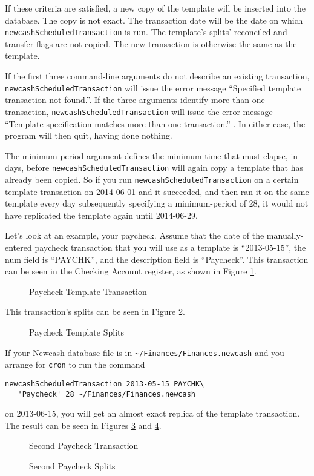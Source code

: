 \documentclass{report}
\newcommand{\graphicsfig}[5]{
\begin{figure}[#5]
\begin{center}
\resizebox{#1}{!}{\texttt{[image: \#2]}}
\end{center}
\caption{#3}
\label{#4}
\end{figure}
}
\begin{document}
If these criteria are satisfied, a new copy of the template will be inserted into the database. The copy is not exact. The transaction date will be the date on which \verb|newcashScheduledTransaction| is run. The template's splits' reconciled and transfer flags are not copied. The new transaction is otherwise the same as the template.

If the first three command-line arguments do not describe an existing transaction, \verb|newcashScheduledTransaction| will issue the error message ``Specified template transaction not found.''. If the three arguments identify more than one transaction, \verb|newcashScheduledTransaction| will issue the error message ``Template specification matches more than one transaction.'' . In either case, the program will then quit, having done nothing.

The minimum-period argument defines the minimum time that must elapse, in days, before \verb|newcashScheduledTransaction| will again copy a template that has already been copied. So if you run \verb|newcashScheduledTransaction| on a certain template transaction on 2014-06-01 and it succeeded, and then ran it on the same template every day subsequently specifying a minimum-period of 28, it would not have replicated the template again until 2014-06-29.

Let's look at an example, your paycheck. Assume that the date of the manually-entered paycheck transaction that you will use as a template is ``2013-05-15'', the num field is ``PAYCHK'', and the description field is ``Paycheck''. This transaction can be seen in the Checking Account register, as shown in Figure \ref{Paycheck Template Transaction}.
\graphicsfig{5in}{figures/paycheck_template_transaction.png}{Paycheck Template Transaction}{Paycheck Template Transaction}{}
This transaction's splits can be seen in Figure \ref{Paycheck Template Splits}.
\graphicsfig{5in}{figures/paycheck_template_splits.png}{Paycheck Template Splits}{Paycheck Template Splits}{}

If  your Newcash database file is in \verb|~/Finances/Finances.newcash|  and you arrange for \verb|cron| to run the command
\begin{verbatim}
newcashScheduledTransaction 2013-05-15 PAYCHK\
   'Paycheck' 28 ~/Finances/Finances.newcash
\end{verbatim}
on 2013-06-15, you will get an almost exact replica of the template transaction. The result can be seen in Figures  \ref{Second Paycheck Transaction} and \ref{Second Paycheck Splits}.
\graphicsfig{5in}{figures/second_paycheck_transaction.png}{Second Paycheck Transaction}{Second Paycheck Transaction}{}
\graphicsfig{5in}{figures/second_paycheck_splits.png}{Second Paycheck Splits}{Second Paycheck Splits}{}
\end{document}
